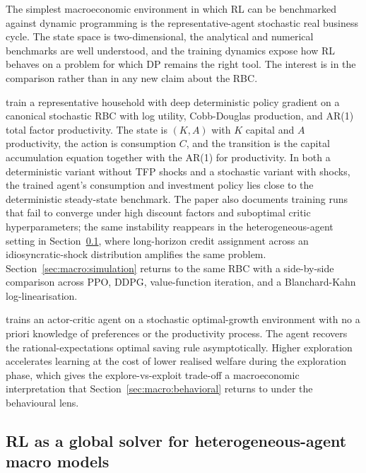 The simplest macroeconomic environment in which RL can be benchmarked
against dynamic programming is the representative-agent stochastic
real business cycle. The state space is two-dimensional, the
analytical and numerical benchmarks are well understood, and the
training dynamics expose how RL behaves on a problem for which DP
remains the right tool. The interest is in the comparison rather
than in any new claim about the RBC.

\citet{Atashbar2023imf} train a representative household with deep
deterministic policy gradient on a canonical stochastic RBC with
log utility, Cobb-Douglas production, and AR(1) total factor
productivity. The state is $(K, A)$ with $K$ capital and $A$
productivity, the action is consumption $C$, and the transition is
the capital accumulation equation together with the AR(1) for
productivity. In both a deterministic variant without TFP shocks and
a stochastic variant with shocks, the trained agent's consumption and
investment policy lies close to the deterministic steady-state
benchmark. The paper also documents training runs that fail to
converge under high discount factors and suboptimal critic
hyperparameters; the same instability reappears in the heterogeneous-agent
setting in
Section~\ref{sec:macro:solver}, where long-horizon credit assignment
across an idiosyncratic-shock distribution amplifies the same problem.
Section~\ref{sec:macro:simulation} returns to the same RBC with a
side-by-side comparison across PPO, DDPG, value-function iteration,
and a Blanchard-Kahn log-linearisation.

\citet{Shi2022consumption} trains an actor-critic agent on a
stochastic optimal-growth environment with no a priori knowledge of
preferences or the productivity process. The agent recovers the
rational-expectations optimal saving rule asymptotically. Higher
exploration accelerates learning at the cost of lower realised welfare
during the exploration phase, which gives the explore-vs-exploit
trade-off a macroeconomic interpretation that
Section~\ref{sec:macro:behavioral} returns to under the behavioural
lens.

\subsection{RL as a global solver for heterogeneous-agent macro models}
\label{sec:macro:solver}

